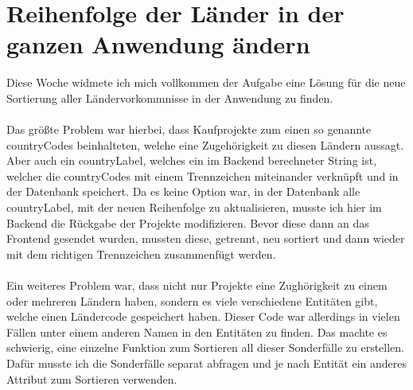 \section{Reihenfolge der Länder in der ganzen Anwendung ändern}
Diese Woche widmete ich mich vollkommen der Aufgabe eine Lösung für die neue Sortierung aller Ländervorkommnisse in der Anwendung zu finden. \\\\
Das größte Problem war hierbei, dass Kaufprojekte zum einen so genannte countryCodes beinhalteten, welche eine Zugehörigkeit zu diesen Ländern aussagt. Aber auch ein countryLabel, welches ein im Backend berechneter String ist, welcher die countryCodes mit einem Trennzeichen miteinander verknüpft und in der Datenbank speichert. Da es keine Option war, in der Datenbank alle countryLabel, mit der neuen Reihenfolge zu aktualisieren, musste ich hier im Backend die Rückgabe der Projekte modifizieren. Bevor diese dann an das Frontend gesendet wurden, mussten diese, getrennt, neu sortiert und dann wieder mit dem richtigen Trennzeichen zusammenfügt werden. \\\\
Ein weiteres Problem war, dass nicht nur Projekte eine Zughörigkeit zu einem oder mehreren Ländern haben, sondern es viele verschiedene Entitäten gibt, welche einen Ländercode gespeichert haben. Dieser Code war allerdings in vielen Fällen unter einem anderen Namen in den Entitäten zu finden. Das machte es schwierig, eine einzelne Funktion zum Sortieren all dieser Sonderfälle zu erstellen. Dafür musste ich die Sonderfälle separat abfragen und je nach Entität ein anderes Attribut zum Sortieren verwenden. \\\\

